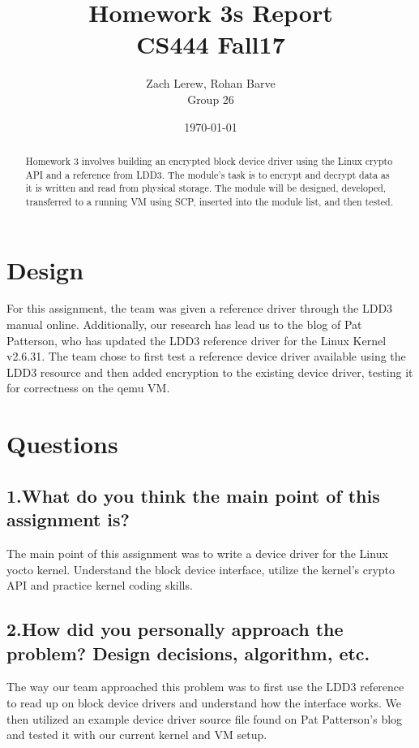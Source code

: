 \documentclass[onecolumn, draftclsnofoot,10pt, compsoc]{IEEEtran}
\title{Homework 3s Report\\\large CS444 Fall17}
\author{Zach Lerew, Rohan Barve\\\large Group 26}
\date{\today}
\begin{document}
  \maketitle

	\begin{titlingpage}
		\begin{abstract}
			\noindent Homework 3 involves building an encrypted block device driver using the Linux crypto API and a reference from LDD3.
      The module's task is to encrypt and decrypt data as it is written and read from physical storage.
      The module will be designed, developed, transferred to a running VM using SCP, inserted into the module list, and then tested.
		\end{abstract}
	\end{titlingpage}

  \clearpage
  \singlespace

	\section*{Design}
  For this assignment, the team was given a reference driver through the LDD3 manual online.
  Additionally, our research has lead us to the blog of Pat Patterson, who has updated the LDD3 reference driver for the Linux Kernel v2.6.31. \cite{pat}
  The team chose to first test a reference device driver available using the LDD3 resource and then added encryption to the existing device driver, testing it for correctness on the qemu VM.

	\section*{Questions}
	\subsection*{1.What do you think the main point of this assignment is?}
	The main point of this assignment was to write a device driver for the Linux yocto kernel.
	Understand the block device interface, utilize the kernel's crypto API and practice kernel
	coding skills.

	\subsection*{2.How did you personally approach the problem? Design decisions, algorithm, etc.}
	The way our team approached this problem was to first use the LDD3 reference to read up on block device drivers and understand how the interface works. We then utilized an example device driver source file found on Pat Patterson's blog and tested it with our current kernel and VM setup.
\end{document}

